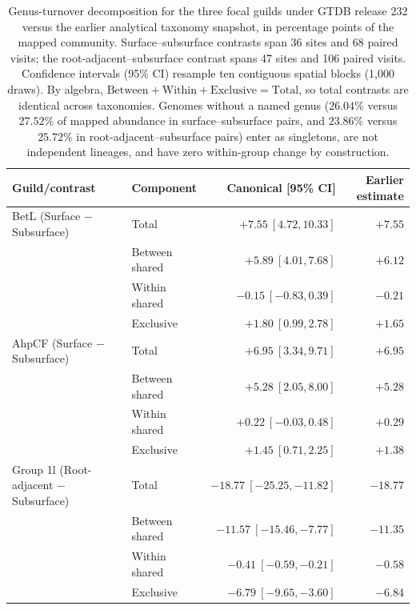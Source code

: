 \begin{table}[htbp]\centering\footnotesize
\caption{Genus-turnover decomposition for the three focal guilds under GTDB release 232 versus the earlier analytical taxonomy snapshot, in percentage points of the mapped community. Surface--subsurface contrasts span 36 sites and 68 paired visits; the root-adjacent--subsurface contrast spans 47 sites and 106 paired visits. Confidence intervals (95\% CI) resample ten contiguous spatial blocks (1,000 draws). By algebra, $\mathrm{Between} + \mathrm{Within} + \mathrm{Exclusive} = \mathrm{Total}$, so total contrasts are identical across taxonomies. Genomes without a named genus ($26.04\%$ versus $27.52\%$ of mapped abundance in surface--subsurface pairs, and $23.86\%$ versus $25.72\%$ in root-adjacent--subsurface pairs) enter as singletons, are not independent lineages, and have zero within-group change by construction.}\label{tab:canonical_turnover_3guilds}
\begin{tabular}{llrr}\toprule
Guild/contrast & Component & Canonical [95\% CI] & Earlier estimate\\\midrule
BetL (Surface $-$ Subsurface) & Total & $+7.55\ [4.72,10.33]$ & $+7.55$\\
 & Between shared & $+5.89\ [4.01,7.68]$ & $+6.12$\\
 & Within shared & $-0.15\ [-0.83,0.39]$ & $-0.21$\\
 & Exclusive & $+1.80\ [0.99,2.78]$ & $+1.65$\\\midrule
AhpCF (Surface $-$ Subsurface) & Total & $+6.95\ [3.34,9.71]$ & $+6.95$\\
 & Between shared & $+5.28\ [2.05,8.00]$ & $+5.28$\\
 & Within shared & $+0.22\ [-0.03,0.48]$ & $+0.29$\\
 & Exclusive & $+1.45\ [0.71,2.25]$ & $+1.38$\\\midrule
Group 1l (Root-adjacent $-$ Subsurface) & Total & $-18.77\ [-25.25,-11.82]$ & $-18.77$\\
 & Between shared & $-11.57\ [-15.46,-7.77]$ & $-11.35$\\
 & Within shared & $-0.41\ [-0.59,-0.21]$ & $-0.58$\\
 & Exclusive & $-6.79\ [-9.65,-3.60]$ & $-6.84$\\\bottomrule
\end{tabular}
\end{table}


